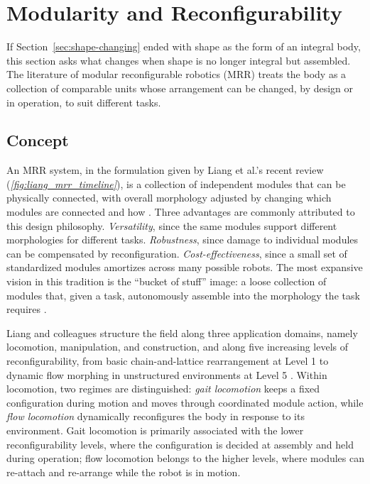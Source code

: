 \section{Modularity and Reconfigurability}
\label{sec:modularity}

If Section~\ref{sec:shape-changing} ended with shape as the form of an integral body, this section asks what changes when shape is no longer integral but assembled. The literature of modular reconfigurable robotics (MRR) treats the body as a collection of comparable units whose arrangement can be changed, by design or in operation, to suit different tasks.

\subsection{Concept}
\label{subsec:mrr-Concept}
 

An MRR system, in the formulation given by Liang et al.'s recent review (\textit{\cref{fig:liang_mrr_timeline}}), is a collection of independent modules that can be physically connected, with overall morphology adjusted by changing which modules are connected and how \cite{liangModularReconfigurableRobots2026}. Three advantages are commonly attributed to this design philosophy. \textit{Versatility}, since the same modules support different morphologies for different tasks. \textit{Robustness}, since damage to individual modules can be compensated by reconfiguration. \textit{Cost-effectiveness}, since a small set of standardized modules amortizes across many possible robots. The most expansive vision in this tradition is the ``bucket of stuff'' image: a loose collection of modules that, given a task, autonomously assemble into the morphology the task requires \cite{liangModularReconfigurableRobots2026}.

Liang and colleagues structure the field along three application domains, namely locomotion, manipulation, and construction, and along five increasing levels of reconfigurability, from basic chain-and-lattice rearrangement at Level 1 to dynamic flow morphing in unstructured environments at Level 5 \cite{liangModularReconfigurableRobots2026}. Within locomotion, two regimes are distinguished: \textit{gait locomotion} keeps a fixed configuration during motion and moves through coordinated module action, while \textit{flow locomotion} dynamically reconfigures the body in response to its environment. Gait locomotion is primarily associated with the lower reconfigurability levels, where the configuration is decided at assembly and held during operation; flow locomotion belongs to the higher levels, where modules can re-attach and re-arrange while the robot is in motion.


